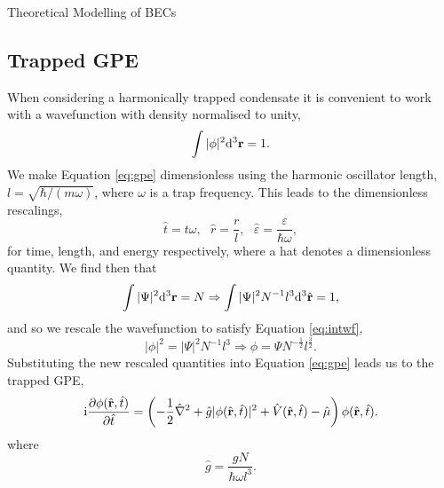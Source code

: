 \begin{chapter}{\label{cha:theoretical_model}Theoretical Modelling of BECs}
	\subsection{\label{section:gpedimlesstrap} Trapped GPE}
		When considering a harmonically trapped condensate it is convenient to work with a wavefunction with density normalised to unity,
		\begin{equation}\label{eq:intwf}
			\int |\phi|^2 \mathrm{d}^3{\bf r} = 1.
		\end{equation}
		We make Equation \ref{eq:gpe} dimensionless using the harmonic oscillator length, $l = \sqrt{\hbar/(m\omega)}$, where $\omega$ is a trap frequency. This leads to the dimensionless rescalings,
		\begin{equation}
			\hat{t} = t\omega, ~~~ \hat{r} = \frac{r}{l}, ~~~ \hat{\varepsilon}= \frac{\varepsilon}{\hbar\omega},
		\end{equation}
		for time, length, and energy respectively, where a hat denotes a dimensionless quantity.
		We find then that
		\begin{equation}
			\int |\Psi|^2 \mathrm{d}^3{\bf r} = N \Rightarrow \int |\Psi|^2 N^{-1} l^3\mathrm{d}^3\hat{\bf r} = 1,
		\end{equation}
		and so we rescale the wavefunction to satisfy Equation \ref{eq:intwf},
		\begin{equation}
			 |\phi|^2 = |\Psi|^2 N^{-1} l^3 \Rightarrow \phi = \Psi N^{-\frac{1}{2}} l^\frac{3}{2}.
		\end{equation}
	Substituting the new rescaled quantities into Equation \ref{eq:gpe} leads us to the trapped GPE,
	\begin{equation}\label{eq:dimgpetrapped}
		\mathrm{i}\frac{\partial\phi({\hat{\bf r}},\hat{t})}{\partial {\hat{t}}} = \left( -\frac{1}{2}\hat{\nabla}^2 + \hat{g}|\phi({\hat{\bf r}},\hat{t})|^2 + \hat{V}({\hat{\bf r}},\hat{t}) - \hat{\mu} \right) \phi({\hat{\bf r}},\hat{t}).
	\end{equation}
	where
	\begin{equation}
		 \hat{g} = \frac{gN}{\hbar \omega l^3}.
	\end{equation}


\end{chapter}
